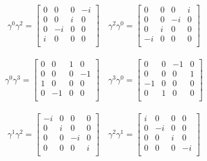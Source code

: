 \begin{align*}
\gamma^0 \gamma^2 = \begin{bmatrix}
 0  &  0  &  0  &  -i  \\
 0  &  0  &  i  &  0  \\
 0  &  -i  &  0  &  0  \\
 i  &  0  &  0  &  0  \\
\end{bmatrix} \quad
\gamma^2 \gamma^0 = \begin{bmatrix}
 0  &  0  &  0  &  i  \\
 0  &  0  &  -i  &  0  \\
 0  &  i  &  0  &  0  \\
 -i  &  0  &  0  &  0  \\
\end{bmatrix}
\end{align*}

\begin{align*}
\gamma^0 \gamma^3 = \begin{bmatrix}
 0  &  0  &  1  &  0  \\
 0  &  0  &  0  &  -1  \\
 1  &  0  &  0  &  0  \\
 0  &  -1  &  0  &  0  \\
\end{bmatrix} \quad
\gamma^3 \gamma^0 = \begin{bmatrix}
 0  &  0  &  -1  &  0  \\
 0  &  0  &  0  &  1  \\
 -1  &  0  &  0  &  0  \\
 0  &  1  &  0  &  0  \\
\end{bmatrix}
\end{align*}

\begin{align*}
\gamma^1 \gamma^2 = \begin{bmatrix}
 -i  &  0  &  0  &  0  \\
 0  &  i  &  0  &  0  \\
 0  &  0  &  -i  &  0  \\
 0  &  0  &  0  &  i  \\
\end{bmatrix} \quad
\gamma^2 \gamma^1 = \begin{bmatrix}
 i  &  0  &  0  &  0  \\
 0  &  -i  &  0  &  0  \\
 0  &  0  &  i  &  0  \\
 0  &  0  &  0  &  -i  \\
\end{bmatrix}
\end{align*}

